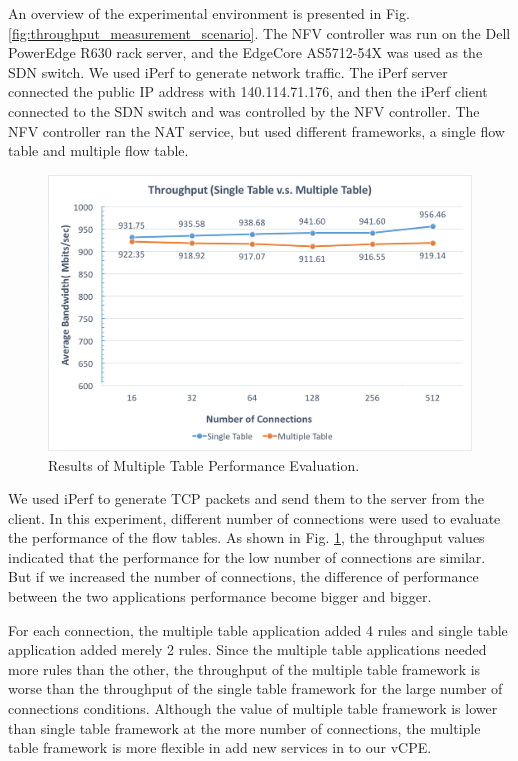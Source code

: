 An overview of the experimental environment is presented in Fig. \ref{fig:throughput_measurement_scenario}. The NFV controller was run on the Dell PowerEdge R630 rack server, and the EdgeCore AS5712-54X \cite{edge-core-switch} was used as the SDN switch.
We used iPerf \cite{iperf} to generate network traffic. The iPerf server connected the public IP address with 140.114.71.176, and then the iPerf client connected to the SDN switch and was controlled by the NFV controller.
The NFV controller ran the NAT service, but used different frameworks, a single flow table and multiple flow table.

\begin{figure}[!t]
\centering
\includegraphics[width=\textwidth]{./fig/throughput_measurement.png}
\caption{Results of Multiple Table Performance Evaluation.}
\label{fig:throughput_measurement}
\end{figure}

We used iPerf to generate TCP packets and send them to the server from the client.
In this experiment, different number of connections were used to evaluate the performance of the flow tables.
As shown in Fig. \ref{fig:throughput_measurement}, the throughput values indicated that the performance for the low number of connections are similar.
But if we increased the number of connections, the difference of performance between the two applications performance become bigger and bigger.

For each connection, the multiple table application added 4 rules and single table application added merely 2 rules. Since the multiple table applications needed more rules than the other, the throughput of the multiple table framework is worse than the throughput of the single table framework for the large number of connections conditions.
Although the value of multiple table framework is lower than single table framework at the more number of connections, the multiple table framework is more flexible in add new services in to our vCPE.



